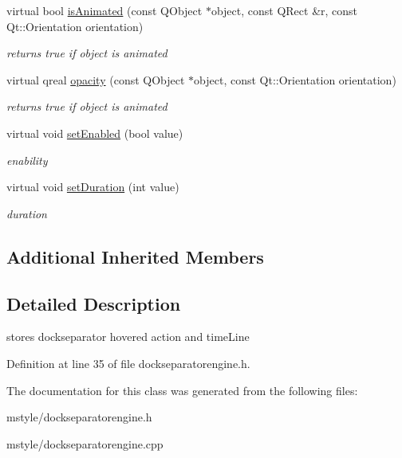 \begin{DoxyCompactItemize}
virtual bool \hyperlink{class_dock_separator_engine_a3ee05c4ef4f07122893a85bfc4d60443}{is\+Animated} (const Q\+Object $\ast$object, const Q\+Rect \&r, const Qt\+::\+Orientation orientation)
\begin{DoxyCompactList}\small\item\em returns true if object is animated \end{DoxyCompactList}\item 
\mbox{\label{class_dock_separator_engine_aa7ff69facd475a64032dee1c1fffee75}} 
virtual qreal \hyperlink{class_dock_separator_engine_aa7ff69facd475a64032dee1c1fffee75}{opacity} (const Q\+Object $\ast$object, const Qt\+::\+Orientation orientation)
\begin{DoxyCompactList}\small\item\em returns true if object is animated \end{DoxyCompactList}\item 
\mbox{\label{class_dock_separator_engine_a112136ed8fe534a9ae08fa2518385881}} 
virtual void \hyperlink{class_dock_separator_engine_a112136ed8fe534a9ae08fa2518385881}{set\+Enabled} (bool value)
\begin{DoxyCompactList}\small\item\em enability \end{DoxyCompactList}\item 
\mbox{\label{class_dock_separator_engine_ad31fc073fb91a126ec1b81d698a6b092}} 
virtual void \hyperlink{class_dock_separator_engine_ad31fc073fb91a126ec1b81d698a6b092}{set\+Duration} (int value)
\begin{DoxyCompactList}\small\item\em duration \end{DoxyCompactList}\end{DoxyCompactItemize}
\subsection*{Additional Inherited Members}


\subsection{Detailed Description}
stores dockseparator hovered action and time\+Line 

Definition at line 35 of file dockseparatorengine.\+h.



The documentation for this class was generated from the following files\+:\begin{DoxyCompactItemize}
\item 
mstyle/dockseparatorengine.\+h\item 
mstyle/dockseparatorengine.\+cpp\end{DoxyCompactItemize}
